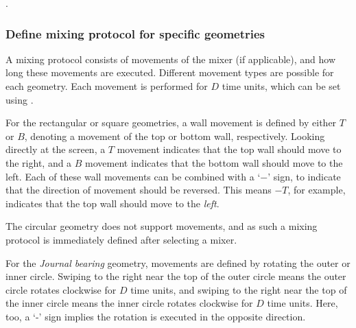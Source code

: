. %

\subsubsection{Define mixing protocol for specific geometries}
A mixing protocol consists of movements of the mixer (if applicable), and how long these movements are executed. Different movement types are possible for each geometry. Each movement is performed for $D$ time units, which can be set using .

For the rectangular or square geometries, a wall movement is defined by either $T$ or $B$, denoting a movement of the top or bottom wall, respectively. Looking directly at the screen, a $T$ movement indicates that the top wall should move to the right, and a $B$ movement indicates that the bottom wall should move to the left. Each of these wall movements can be combined with a `$-$' sign, to indicate that the direction of movement should be reversed. This means $-T$, for example, indicates that the top wall should move to the \emph{left}.

The circular geometry does not support movements, and as such a mixing protocol is immediately defined after selecting a mixer.

For the \emph{Journal bearing} geometry, movements are defined by rotating the outer or inner circle. Swiping to the right near the top of the outer circle means the outer circle rotates clockwise for $D$ time units, and swiping to the right near the top of the inner circle means the inner circle rotates clockwise for $D$ time units. Here, too, a `-' sign implies the rotation is executed in the opposite direction.


